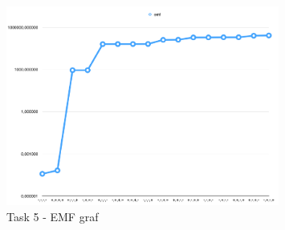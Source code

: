 \begin{figure}[h]
		\centering
	    \includegraphics[width=0.8\textwidth]{sections/Exercise5/emf_graph.png}
		    \caption{Task 5 - EMF graf}
		    \label{fig:task5EMF_graph}
	\end{figure}

